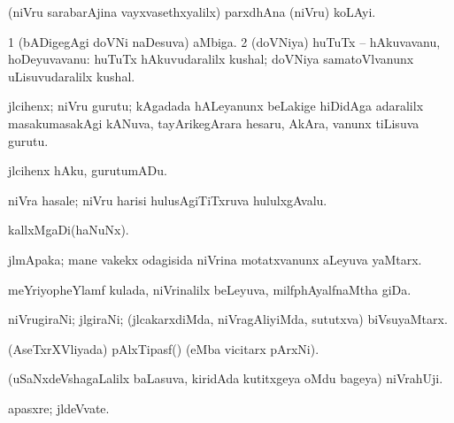 {\bentry
{} 
\gl{\nA}
\expl{}
\bmng
(niVru sarabarAjina vayxvasethxyalilx) parxdhAna (niVru) koLAyi. 
\emng
\eentry

\bentry
{} 
\gl{\nA}
\bmng
\bnum
\num{1} (bADigegAgi doVNi naDesuva) aMbiga. 
\num{2} (doVNiya) huTuTx -- hAkuvavanu, hoDeyuvavanu:  huTuTx hAkuvudaralilx kushal; doVNiya samatoVlvanunx uLisuvudaralilx kushal. 
\enum
\emng
\eentry

\bentry
{} 
\gl{\nA}
\expl{}
\bmng
jlcihenx; niVru gurutu; kAgadada hALeyanunx beLakige hiDidAga adaralilx masakumasakAgi kANuva, tayArikegArara hesaru, AkAra, \mo vanunx tiLisuva gurutu. 
\emng
\eentry

\bentry
{} 
\gl{\sakirx}
\expl{}
\bmng
jlcihenx hAku, gurutumADu. 
\emng
\eentry

\bentry
{} 
\gl{\nA}
\expl{}
\bmng
niVra hasale; niVru harisi hulusAgiTiTxruva hululxgAvalu. 
\emng
\eentry

\bentry
{} 
\gl{\nA}
\expl{}
\bmng
kallxMgaDi(haNuNx). 
\emng
\eentry

\bentry
{} 
\gl{\nA}
\expl{}
\bmng
jlmApaka; mane \mo vakekx odagisida niVrina motatxvanunx aLeyuva yaMtarx. 
\emng
\eentry

\bentry
{} 
\gl{\nA}
\expl{}
\bmng
meYriyopheYlamf kulada, niVrinalilx beLeyuva, milfphAyalfnaMtha giDa. 
\emng
\eentry

\bentry
{} 
\gl{\nA}
\expl{}
\bmng
niVrugiraNi; jlgiraNi; (jlcakarxdiMda, niVragAliyiMda, sututxva) biVsuyaMtarx. 
\emng
\eentry

\bentry
{} 
\gl{\nA}
\expl{}
\bmng
(AseTxrXVliyada) pAlxTipasf() (eMba vicitarx pArxNi). 
\emng
\eentry

\bentry
{} 
\gl{\nA}
\expl{}
\bmng
(uSaNxdeVshagaLalilx baLasuva, kiridAda kutitxgeya oMdu bageya) niVrahUji. 
\emng
\eentry

\bentry
{} 
\gl{\nA}
\expl{}
\bmng
{} 
\emng
\eentry

\bentry
{} 
\gl{\nA}
\expl{}
\bmng
apasxre; jldeVvate. 
\emng
\eentry

}
